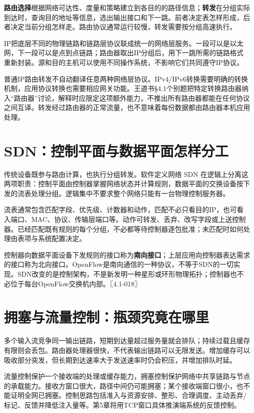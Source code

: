 \textbf{路由选择}根据网络可达性、度量和策略建立到各目的的路径信息；\textbf{转发}在分组实际到达时，查询目的地址等信息，选出输出接口和下一跳。前者决定表怎样形成，后者决定当前分组怎样走。路由协议通常运行较慢，转发需要按分组高速执行。

IP把底层不同的物理链路和链路层协议联成统一的网络层服务。一段可以是以太网，下一段可以是点到点链路；路由器取出IP分组后，用下一跳所需的链路格式重新封装。源和目的主机可以使用不同操作系统，不影响它们共同遵守IP协议。

普通IP路由转发不自动翻译任意两种网络层协议。IPv4/IPv6转换需要明确的转换机制，应用协议转换也需要相应网关功能。王道书§4.1个别题把特定转换路由器纳入``路由器''讨论，解释时应限定这项额外能力，不推出所有路由器都能在任何协议之间互译。转发经过路由器的正常流量，也不意味着每份数据都由路由器本机应用处理。

\section{SDN：控制平面与数据平面怎样分工}\label{cn-04-02}

传统设备既参与路由计算，也执行分组转发。软件定义网络 SDN 在逻辑上分离这两项职责：控制平面由控制器掌握网络状态并计算规则，数据平面的交换设备按下发的流表处理分组。逻辑集中不要求整个网络只能有一台物理控制服务器。

流表通常包含匹配字段、优先级、计数器和动作，匹配不必只看目的IP，也可看入端口、MAC、协议、传输层端口等。动作可转发、丢弃、改写字段或上送控制器。已经匹配既有规则的每个分组，不必都等待控制器逐包批准；未匹配时如何处理由表项与系统配置决定。

控制器向数据平面设备下发规则的接口称为\textbf{南向接口}；上层应用向控制器表达需求的接口称为北向接口。OpenFlow是南向通信的一种协议，不等于SDN的一切实现。SDN改变的是控制架构，不是新发明一种星形或环形物理拓扑；控制器也不必位于每台OpenFlow交换机内部。〖4.1-018〗

\section{拥塞与流量控制：瓶颈究竟在哪里}\label{cn-04-03}

多个输入流竞争同一输出链路，短期到达量超过服务量就会排队；持续过载且缓存有限则会丢包。路由器处理器很快，不代表输出链路可以无限发送。增加缓存可以吸收部分突发，但长期到达速率大于发送速率时仍会积压，并增加排队时延。

流量控制保护一个接收端的处理或缓存能力，拥塞控制保护网络中共享链路与节点的承载能力。接收方窗口很大，路径中间仍可能拥塞；某个接收端窗口很小，也不能证明全网已拥塞。控制思路包括准入与资源安排、整形、合理调度、主动丢弃/标记、反馈并降低注入量等。第5章将用TCP窗口具体推演端系统的反馈控制。

